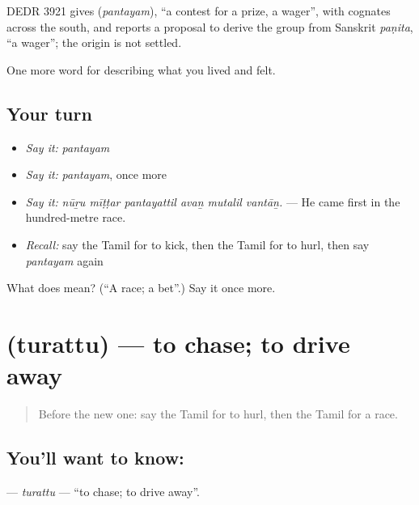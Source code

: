 \begin{cousinweb}
DEDR 3921 gives \textbf{} (\emph{pantayam}), \textquotedblleft{}a contest for a prize, a wager\textquotedblright{}, with cognates across the south, and reports a proposal to derive the group from Sanskrit \emph{paṇita}, \textquotedblleft{}a wager\textquotedblright{}; the origin is not settled.
\end{cousinweb}

\begin{grammarlens}[title={What you've built}]
One more word for describing what you lived and felt.
\end{grammarlens}

\subsection*{Your turn}
\begin{itemize}
\raggedright
  \item \emph{Say it:} \emph{pantayam}
  \item \emph{Say it:} \emph{pantayam}, once more
  \item \emph{Say it:} \emph{nūṟu mīṭṭar pantayattil avaṉ mutalil vantāṉ.} — He came first in the hundred-metre race.
  \item \emph{Recall:} say the Tamil for to kick, then the Tamil for to hurl, then say \emph{pantayam} again
\end{itemize}

\begin{tcolorbox}[breakable,colback=teal!4,colframe=teal!35!black,title={Before you move on}]
What does  mean? (\textquotedblleft{}A race; a bet\textquotedblright{}.) Say it once more.
\end{tcolorbox}
\section[\texorpdfstring{\ta{துரத்து} (turattu)}{துரத்து (turattu)}]{ (turattu) — to chase; to drive away}

\label{lesson:TA-C533-turattu}



\begin{quote}
Before the new one: say the Tamil for to hurl, then the Tamil for a race.
\end{quote}

\subsection*{You'll want to know: }
\textbf{} — \emph{turattu} — \textquotedblleft{}to chase; to drive away\textquotedblright{}.

